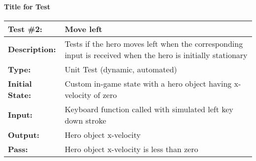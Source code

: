 \documentclass[12pt, titlepage]{article}
\begin{document}
		
\paragraph{Title for Test}

\renewcommand{\arraystretch}{1.5}
\begin{center}
  \begin{tabular}{|p{3cm} p{10cm}|}\hline
    \textbf{Test \#2:} & \textbf{Move left}\\\hline

    \textbf{Description:} & Tests if the hero moves left when the corresponding input is received when the hero is initially stationary \\ 

    \textbf{Type:} & Unit Test (dynamic, automated) \\ 

    \textbf{Initial State:} & Custom in-game state with a hero object having x-velocity of zero \\ 

    \textbf{Input:} & Keyboard function called with simulated left key down stroke \\ 

    \textbf{Output:} & Hero object x-velocity \\ 

    \textbf{Pass:} & Hero object x-velocity is less than zero \\ 
    
    \hline\end{tabular}
\end{center}
  
\end{document}
